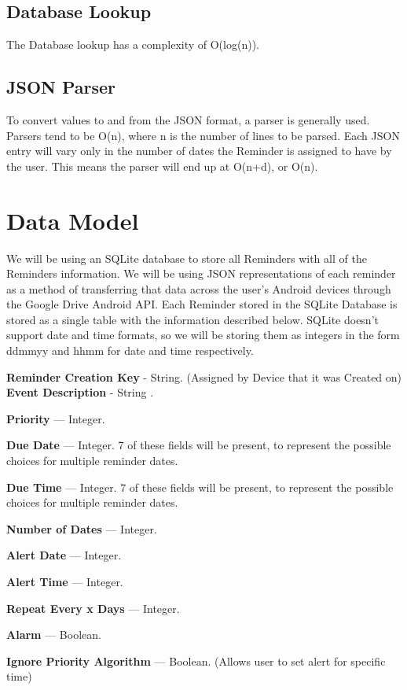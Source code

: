 \documentclass[12pt]{article}
\begin{document}
\subsection{Database Lookup}
The Database lookup has a complexity of O(log(n)).

\subsection{JSON Parser}
To convert values to and from the JSON format, a parser is generally used. Parsers tend to be O(n), where n is the number of lines to be parsed. Each JSON entry will vary only in the number of dates the Reminder is assigned to have by the user. This means the parser will end up at O(n+d), or O(n).

\section{Data Model}

We will be using an SQLite database to store all Reminders with all of the Reminders information. We will be using JSON representations of each reminder as a method of transferring that data across the user's Android devices through the Google Drive Android API. Each Reminder stored in the SQLite Database is stored as a single table with the information described below. SQLite doesn’t support date and time formats, so we will be storing them as integers in the form ddmmyy and hhmm for date and time respectively.

\textbf{Reminder Creation Key} - String. (Assigned by Device that it was Created on)
\textbf{Event Description} - String .

\textbf{Priority} --- Integer.

\textbf{Due Date} --- Integer. 7 of these fields will be present, to represent the possible choices for multiple reminder dates.

\textbf{Due Time} --- Integer. 7 of these fields will be present, to represent the possible choices for multiple reminder dates.

\textbf{Number of Dates} --- Integer.

\textbf{Alert Date} --- Integer.

\textbf{Alert Time} --- Integer.

\textbf{Repeat Every x Days} --- Integer.

\textbf{Alarm} --- Boolean.

\textbf{Ignore Priority Algorithm} --- Boolean. (Allows user to set alert for specific time)
\end{document}
